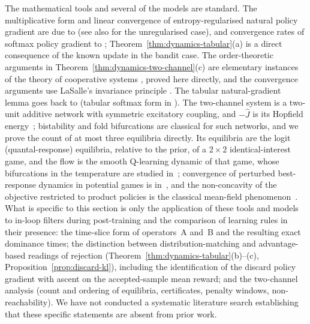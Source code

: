 \begin{remark}
\label{rem:known-vs-new}
The mathematical tools and several of the models are standard. The multiplicative form and linear
convergence of entropy-regularised natural policy gradient are due to
\cite{cen2022fast} (see also \cite{agarwal2021theory} for the
unregularised case), and convergence rates of softmax policy gradient to
\cite{mei2020global}; Theorem~\ref{thm:dynamics-tabular}(a) is a direct
consequence of the known update in the bandit case. The order-theoretic
arguments in Theorem~\ref{thm:dynamics-two-channel}(c) are elementary
instances of the theory of cooperative systems
\cite{smith1995monotone,hirsch2006monotone}, proved here directly, and the
convergence arguments use LaSalle's invariance principle
\cite{lasalle1976stability}. The tabular natural-gradient lemma goes back to \cite{kakade2001natural} (tabular softmax form in \cite{agarwal2021theory}). The two-channel system is a two-unit additive network with symmetric excitatory coupling, and $-\hat J$ is its Hopfield energy~\cite{hopfield1984,cohen1983}; bistability and fold bifurcations are classical for such networks, and we prove the count of at most three equilibria directly. Its equilibria are the logit (quantal-response) equilibria, relative to the prior, of a $2\times2$ identical-interest game, and the flow is the smooth Q-learning dynamic of that game, whose bifurcations in the temperature are studied in~\cite{leonardos2022}; convergence of perturbed best-response dynamics in potential games is in~\cite{hofbauer2002}, and the non-concavity of the objective restricted to product policies is the classical mean-field phenomenon~\cite{wainwright2008}. What is specific to this section is only the
application of these tools and models to in-loop filters during post-training and the comparison of learning rules in their presence: the time-slice form of operators~A and~B and the resulting
exact dominance times; the distinction between distribution-matching and
advantage-based readings of rejection
(Theorem~\ref{thm:dynamics-tabular}(b)--(c),
Proposition~\ref{prop:discard-kl}), including the identification of the
discard policy gradient with ascent on the accepted-sample mean reward;
and the two-channel analysis (count and ordering of equilibria,
certificates, penalty windows, non-reachability). We have not conducted a
systematic literature search establishing that these specific statements
are absent from prior work.
\end{remark}
